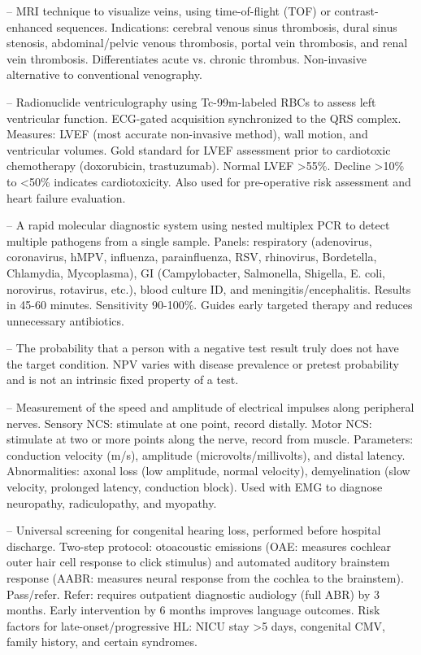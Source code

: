 -- MRI technique to visualize veins, using time-of-flight (TOF) or contrast-enhanced sequences. Indications: cerebral venous sinus thrombosis, dural sinus stenosis, abdominal/pelvic venous thrombosis, portal vein thrombosis, and renal vein thrombosis. Differentiates acute vs. chronic thrombus. Non-invasive alternative to conventional venography.

-- Radionuclide ventriculography using Tc-99m-labeled RBCs to assess left ventricular function. ECG-gated acquisition synchronized to the QRS complex. Measures: LVEF (most accurate non-invasive method), wall motion, and ventricular volumes. Gold standard for LVEF assessment prior to cardiotoxic chemotherapy (doxorubicin, trastuzumab). Normal LVEF >55\%. Decline >10\% to <50\% indicates cardiotoxicity. Also used for pre-operative risk assessment and heart failure evaluation.

-- A rapid molecular diagnostic system using nested multiplex PCR to detect multiple pathogens from a single sample. Panels: respiratory (adenovirus, coronavirus, hMPV, influenza, parainfluenza, RSV, rhinovirus, Bordetella, Chlamydia, Mycoplasma), GI (Campylobacter, Salmonella, Shigella, E. coli, norovirus, rotavirus, etc.), blood culture ID, and meningitis/encephalitis. Results in 45-60 minutes. Sensitivity 90-100\%. Guides early targeted therapy and reduces unnecessary antibiotics.

-- The probability that a person with a negative test result truly does not have the target condition. NPV varies with disease prevalence or pretest probability and is not an intrinsic fixed property of a test.

-- Measurement of the speed and amplitude of electrical impulses along peripheral nerves. Sensory NCS: stimulate at one point, record distally. Motor NCS: stimulate at two or more points along the nerve, record from muscle. Parameters: conduction velocity (m/s), amplitude (microvolts/millivolts), and distal latency. Abnormalities: axonal loss (low amplitude, normal velocity), demyelination (slow velocity, prolonged latency, conduction block). Used with EMG to diagnose neuropathy, radiculopathy, and myopathy.

-- Universal screening for congenital hearing loss, performed before hospital discharge. Two-step protocol: otoacoustic emissions (OAE: measures cochlear outer hair cell response to click stimulus) and automated auditory brainstem response (AABR: measures neural response from the cochlea to the brainstem). Pass/refer. Refer: requires outpatient diagnostic audiology (full ABR) by 3 months. Early intervention by 6 months improves language outcomes. Risk factors for late-onset/progressive HL: NICU stay >5 days, congenital CMV, family history, and certain syndromes.

